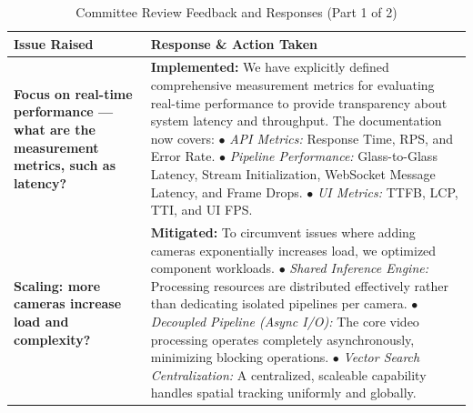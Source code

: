 \begin{table}[!htp]
    \centering
    \caption{Committee Review Feedback and Responses (Part 1 of 2)}
    \renewcommand{\arraystretch}{1.5}
    \begin{tabularx}{\textwidth}{|>{\hsize=0.5\hsize\raggedright}X|>{\hsize=1.5\hsize\raggedright\arraybackslash}X|}
        \hline
        \textbf{Issue Raised} & \textbf{Response \& Action Taken} \\
        \hline
        \textbf{Focus on real-time performance — what are the measurement metrics, such as latency?} &
        \textbf{Implemented:} We have explicitly defined comprehensive measurement metrics for evaluating real-time performance to provide transparency about system latency and throughput. The documentation now covers: \newline
        $\bullet$ \textit{API Metrics:} Response Time, RPS, and Error Rate. \newline
        $\bullet$ \textit{Pipeline Performance:} Glass-to-Glass Latency, Stream Initialization, WebSocket Message Latency, and Frame Drops. \newline
        $\bullet$ \textit{UI Metrics:} TTFB, LCP, TTI, and UI FPS. \\
        \hline
        \textbf{Scaling: more cameras increase load and complexity?} &
        \textbf{Mitigated:} To circumvent issues where adding cameras exponentially increases load, we optimized component workloads. \newline
        $\bullet$ \textit{Shared Inference Engine:} Processing resources are distributed effectively rather than dedicating isolated pipelines per camera. \newline
        $\bullet$ \textit{Decoupled Pipeline (Async I/O):} The core video processing operates completely asynchronously, minimizing blocking operations. \newline
        $\bullet$ \textit{Vector Search Centralization:} A centralized, scaleable capability handles spatial tracking uniformly and globally. \\
        \hline
    \end{tabularx}
\end{table}

